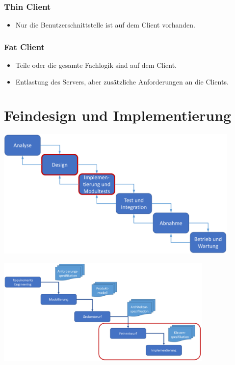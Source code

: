 \documentclass[11pt, a4paper]{article}
\begin{document}
\subsubsection{Thin Client}
\begin{itemize}
    \item Nur die Benutzerschnittstelle ist auf dem Client vorhanden.
\end{itemize}

\subsubsection{Fat Client}
\begin{itemize}
    \item Teile oder die gesamte Fachlogik sind auf dem Client.
    \item Entlastung des Servers, aber zusätzliche Anforderungen an die Clients.
\end{itemize}

\vspace{4em}

\raggedright \section{Feindesign und Implementierung} %

\centering \includegraphics[width=0.9\textwidth]{Feindesign-00.png} 

\centering \includegraphics[width=0.8\textwidth]{Feindesign-01.png}
\end{document}
